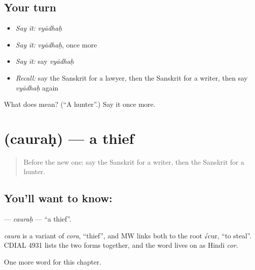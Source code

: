 \subsection*{Your turn}
\begin{itemize}
\raggedright
  \item \emph{Say it:} \emph{vyādhaḥ}
  \item \emph{Say it:} \emph{vyādhaḥ}, once more
  \item \emph{Say it:} say \emph{vyādhaḥ}
  \item \emph{Recall:} say the Sanskrit for a lawyer, then the Sanskrit for a writer, then say \emph{vyādhaḥ} again
\end{itemize}

\begin{tcolorbox}[breakable,colback=teal!4,colframe=teal!35!black,title={Before you move on}]
What does  mean? (\textquotedblleft{}A hunter\textquotedblright{}.) Say it once more.
\end{tcolorbox}
\section[\texorpdfstring{\sk{चौरः} (cauraḥ)}{चौरः (cauraḥ)}]{ (cauraḥ) — a thief}

\label{lesson:SA-C180-caurah}



\begin{quote}
Before the new one: say the Sanskrit for a writer, then the Sanskrit for a hunter.
\end{quote}

\subsection*{You'll want to know: }
\textbf{} — \emph{cauraḥ} — \textquotedblleft{}a thief\textquotedblright{}.

\begin{cousinweb}
\emph{caura} is a variant of \emph{cora}, \textquotedblleft{}thief\textquotedblright{}, and MW links both to the root √cur, \textquotedblleft{}to steal\textquotedblright{}. CDIAL 4931 lists the two forms together, and the word lives on as Hindi \emph{cor}.
\end{cousinweb}

\begin{grammarlens}[title={What you've built}]
One more word for this chapter.
\end{grammarlens}

